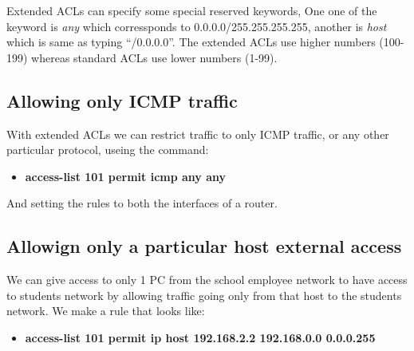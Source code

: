 \documentclass{article}
\begin{document}
Extended ACLs can specify some special reserved keywords, One one of the keyword is \textit{any} which corressponds to 0.0.0.0/255.255.255.255, another is \textit{host} which is same as typing ``/0.0.0.0''. The extended ACLs use higher numbers (100-199) whereas standard ACLs use lower numbers (1-99). 

\subsection{Allowing only ICMP traffic}

With extended ACLs we can restrict traffic to only ICMP traffic, or any other particular protocol, useing the command: 
\begin{itemize}
\item \textbf{access-list 101 permit icmp any any}
\end{itemize}  And setting the rules to both the interfaces of a router. 

\subsection{Allowign only a particular host external access}

We can give access to only 1 PC from the school employee network to have access to students network by allowing traffic going only from that host to the students network. We make a rule that looks like:\\
\begin{itemize}
\item \textbf{access-list 101 permit ip host 192.168.2.2 192.168.0.0 0.0.0.255}
\end{itemize}
\end{document}
